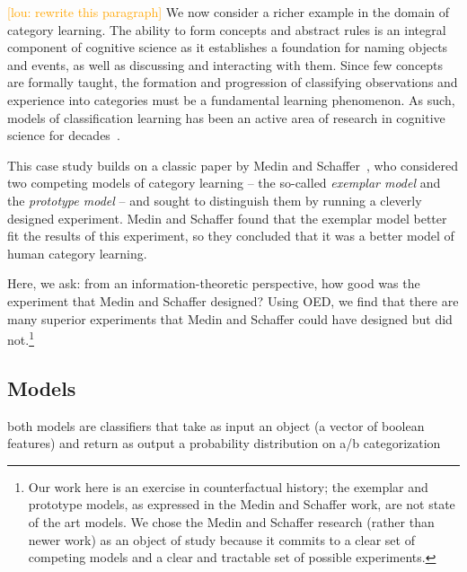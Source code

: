 \documentclass{article}
\newcommand{\lou}[1]{\textcolor{orange}{[lou: #1]}}
\newcommand{\cas}[1]{ \textsf{\color{darkgray} \scriptsize #1} }
\begin{document}
\lou{rewrite this paragraph}
We now consider a richer example in the domain of category learning.
The ability to form concepts and abstract rules is an integral component of cognitive science as it establishes a foundation for naming objects and events, as well as discussing and interacting with them.
Since few concepts are formally taught, the formation and progression of classifying observations and experience into categories must be a fundamental learning phenomenon.
As such, models of classification learning has been an active area of research in cognitive science for decades~\cite{machery10:bbs}.

This case study builds on a classic paper by Medin and Schaffer~\cite{medin78:pr}, who considered two competing models of category learning -- the so-called \emph{exemplar model} and the \emph{prototype model} -- and sought to distinguish them by running a cleverly designed experiment.
Medin and Schaffer found that the exemplar model better fit the results of this experiment, so they concluded that it was a better model of human category learning.

Here, we ask: from an information-theoretic perspective, how good was the experiment that Medin and Schaffer designed?
Using OED, we find that there are many superior experiments that Medin and Schaffer could have designed but did not.\footnote{Our work here is an exercise in counterfactual history; the exemplar and prototype models, as expressed in the Medin and Schaffer work, are not state of the art models. We chose the Medin and Schaffer research (rather than newer work) as an object of study because it commits to a clear set of competing models and a clear and tractable set of possible experiments.}



\subsection{Models}

\cas{both models are classifiers that take as input an object (a vector of boolean features) and return as output a probability distribution on a/b categorization}
\end{document}
